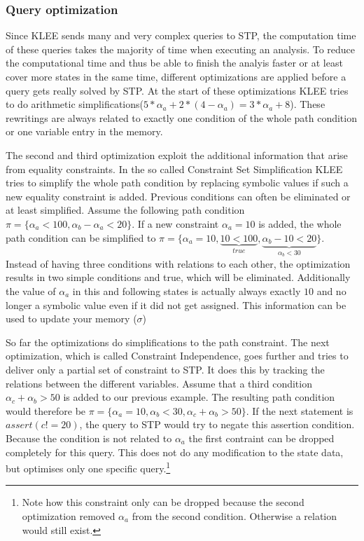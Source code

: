 \subsubsection{Query optimization}
Since KLEE sends many and very complex queries to STP, the computation time of these queries takes the majority of time when executing an analysis. To reduce the computational time and thus be able to finish the analyis faster or at least cover more states in the same time, different optimizations are applied before a query gets really solved by STP. 
At the start of these optimizations KLEE tries to do arithmetic simplifications($5*\alpha_a + 2*(4-\alpha_a) = 3 * \alpha_a + 8$). These rewritings are always related to exactly one condition of the whole path condition or one variable entry in the memory.

The second and third optimization exploit the additional information that arise from equality constraints. In the so called Constraint Set Simplification KLEE tries to simplify the whole path condition by replacing symbolic values if such a new equality constraint is added. Previous conditions can often be eliminated or at least simplified. 
Assume the following path condition $\pi = \{\alpha_a < 100, \alpha_b - \alpha_a< 20\}$. If a new constraint $\alpha_a = 10$ is added, the whole path condition can be simplified to $\pi = \{\alpha_a = 10, \underbrace{10 < 100}_{true},\underbrace{\alpha_b - 10 < 20}_{\alpha_b < 30}\}$. Instead of having three conditions with relations to each other, the optimization results in two simple conditions and true, which will be eliminated. Additionally the value of $\alpha_a$ in this and following states is actually always exactly $10$ and no longer a symbolic value even if it did not get assigned. This information can be used to update your memory ($\sigma$)

So far the optimizations do simplifications to the path constraint. The next optimization, which is called Constraint Independence, goes further and tries to deliver only a partial set of constraint to STP. It does this by tracking the relations between the different variables. Assume that a third condition $\alpha_c + \alpha_b > 50$ is added to our previous example. The resulting path condition would therefore be $\pi = \{\alpha_a = 10, \alpha_b < 30, \alpha_c + \alpha_b > 50\}$. If the next statement is $assert(c != 20)$, the query to STP would try to negate this assertion condition. Because the condition is not related to $\alpha_a$ the first contraint can be dropped completely for this query. This does not do any modification to the state data, but optimises only one specific query.\footnote{Note how this constraint only can be dropped because the second optimization removed $\alpha_a$ from the second condition. Otherwise a relation would still exist.}

